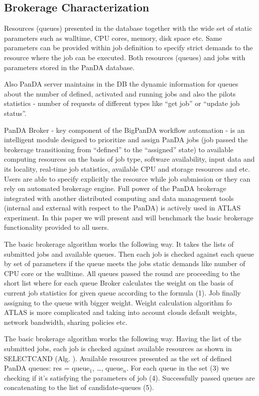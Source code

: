 \subsection{Brokerage Characterization}
\label{subsec:brokerage}

Resources (queues) presented in the database together with the wide set of
static parameters such as walltime, CPU cores, memory, disk space etc. Same
parameters can be provided within job definition to specify strict demands to
the resource where the job can be executed. Both resources (queues) and jobs
with parameters stored in the PanDA database.

Also PanDA server maintains in the DB the dynamic information for queues about
the number of defined, activated and running jobs and also the pilots
statistics - number of requests of different types like ``get job'' or ``update
job status''.

PanDA Broker - key  component of the BigPanDA workflow automation - is an
intelligent module designed to prioritize and assign PanDA jobs (job passed the
brokerage transitioning from ``defined'' to the ``assigned'' state) to
available computing resources on the basis of job type, software availability,
input data and its locality, real-time job statistics, available CPU and
storage resources and etc. Users are able to specify explicitly the resource
while job submission or they can rely on automated brokerage engine. Full power
of the PanDA brokerage integrated with another distributed computing and data
management tools (internal and external with respect to the PanDA) is actively
used in ATLAS experiment. In this paper we will present and will benchmark the
basic brokerage functionality provided to all users.

The basic brokerage algorithm works the following way. It takes the lists of
submitted jobs and available queues. Then each job is checked against each
queue by set of parameters if the queue meets the jobs static demands like
number of CPU core or the walltime. All queues passed the round are proceeding
to the short list where for each queue Broker calculates the weight on the
basis of current job statistics for given queue according to the formula (1).
Job finally assigning to the queue with bigger weight. Weight calculation
algorithm fo ATLAS is more complicated and taking into account clouds default
weights, network bandwidth, sharing policies etc.

The basic brokerage algorithm works the following way. Having the list of the
submitted jobs, each job is checked against available resources as shown in
SELECT{\textunderscore}CAND (Alg. ). Available resources presented as the set
of defined PanDA queues: res = queue$_1$, \ldots, queue$_n$. For each queue in
the set (3) we checking if it's satisfying the parameters of job (4).
Successfully passed queues are concatenating to the list of candidate-queues
(5).

